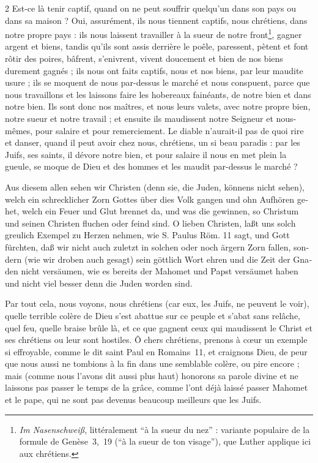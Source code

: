 \documentclass[a4paper,12pt]{article}
\newcommand\chunks[2]{%
\begin{leftcolumn*}\begin{otherlanguage}{german}%
{#1}%
\end{otherlanguage}\end{leftcolumn*}%
\begin{rightcolumn}\begin{otherlanguage}{french}%
{#2}%
\end{otherlanguage}\end{rightcolumn}%
}
\begin{document}
\begin{paracol}{2}
         {Est-ce là tenir captif, quand on ne peut souffrir quelqu’un dans son pays ou dans sa maison ? Oui, assurément, ils nous tiennent captifs, nous chrétiens, dans notre propre pays : ils nous laissent travailler à la sueur de notre front\footnote{\foreignlanguage{german}{\emph{Im Nasenschweiß}}, littéralement \enquote{à la sueur du nez} : variante populaire de la formule de Genèse~3,~19 (\enquote{à la sueur de ton visage}), que Luther applique ici aux chrétiens.}, gagner argent et biens, tandis qu’ils sont assis derrière le poêle, paressent, pètent et font rôtir des poires, bâfrent, s’enivrent, vivent doucement et bien de nos biens durement gagnés ; ils nous ont faits captifs, nous et nos biens, par leur maudite usure ; ils se moquent de nous par-dessus le marché et nous conspuent, parce que nous travaillons et les laissons faire les hobereaux fainéants, de notre bien et dans notre bien. Ils sont donc nos maîtres, et nous leurs valets, avec notre propre bien, notre sueur et notre travail ; et ensuite ils maudissent notre Seigneur et nous-mêmes, pour salaire et pour remerciement. Le diable n’aurait-il pas de quoi rire et danser, quand il peut avoir chez nous, chrétiens, un si beau paradis : par les Juifs, ses saints, il dévore notre bien, et pour salaire il nous en met plein la gueule, se moque de Dieu et des hommes et les maudit par-dessus le marché ?}
  \chunks{\textelp{}}
         {\textelp{}}
  \chunks{Aus diesem allen sehen wir Christen (denn sie, die Juden, könnens nicht sehen), welch ein schrecklicher Zorn Gottes über dies Volk gangen und ohn Aufhören gehet, welch ein Feuer und Glut brennet da, und was die gewinnen, so Christum und seinen Christen fluchen oder feind sind. O lieben Christen, laßt uns solch greulich Exempel zu Herzen nehmen, wie S. Paulus Röm. 11 sagt, und Gott fürchten, daß wir nicht auch zuletzt in solchen oder noch ärgern Zorn fallen, sondern (wie wir droben auch gesagt) sein göttlich Wort ehren und die Zeit der Gnaden nicht versäumen, wie es bereits der Mahomet und Papst versäumet haben und nicht viel besser denn die Juden worden sind.}
         {Par tout cela, nous voyons, nous chrétiens (car eux, les Juifs, ne peuvent le voir), quelle terrible colère de Dieu s’est abattue sur ce peuple et s’abat sans relâche, quel feu, quelle braise brûle là, et ce que gagnent ceux qui maudissent le Christ et ses chrétiens ou leur sont hostiles. Ô chers chrétiens, prenons à cœur un exemple si effroyable, comme le dit saint Paul en Romains~11, et craignons Dieu, de peur que nous aussi ne tombions à la fin dans une semblable colère, ou pire encore ; mais (comme nous l’avons dit aussi plus haut) honorons sa parole divine et ne laissons pas passer le temps de la grâce, comme l’ont déjà laissé passer Mahomet et le pape, qui ne sont pas devenus beaucoup meilleurs que les Juifs.}

\end{paracol}
\end{document}
